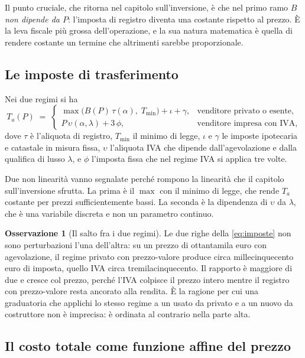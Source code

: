 \documentclass[11pt,a4paper]{article}
\theoremstyle{definition}
\newtheorem{osservazione}[definizione]{Osservazione}
\theoremstyle{plain}
\begin{document}
Il punto cruciale, che ritorna nel capitolo sull'inversione, è che nel primo ramo $B$ \emph{non dipende da $P$}: l'imposta di registro diventa una costante rispetto al prezzo. È la leva fiscale più grossa dell'operazione, e la sua natura matematica è quella di rendere costante un termine che altrimenti sarebbe proporzionale.

\subsection{Le imposte di trasferimento}

Nei due regimi si ha
\begin{equation}
T_a(P) \;=\;
\begin{cases}
\max\big(B(P)\,\tau(\alpha),\; T_{\min}\big) + \iota + \gamma, & \text{venditore privato o esente,}\\[0.4em]
P\,\upsilon(\alpha,\lambda) + 3\,\phi, & \text{venditore impresa con IVA,}
\end{cases}
\label{eq:imposte}
\end{equation}
dove $\tau$ è l'aliquota di registro, $T_{\min}$ il minimo di legge, $\iota$ e $\gamma$ le imposte ipotecaria e catastale in misura fissa, $\upsilon$ l'aliquota IVA che dipende dall'agevolazione e dalla qualifica di lusso $\lambda$, e $\phi$ l'imposta fissa che nel regime IVA si applica tre volte.

Due non linearità vanno segnalate perché rompono la linearità che il capitolo sull'inversione sfrutta. La prima è il $\max$ con il minimo di legge, che rende $T_a$ costante per prezzi sufficientemente bassi. La seconda è la dipendenza di $\upsilon$ da $\lambda$, che è una variabile discreta e non un parametro continuo.

\begin{osservazione}[Il salto fra i due regimi]
Le due righe della \eqref{eq:imposte} non sono perturbazioni l'una dell'altra: su un prezzo di ottantamila euro con agevolazione, il regime privato con prezzo-valore produce circa millecinquecento euro di imposta, quello IVA circa tremilacinquecento. Il rapporto è maggiore di due e cresce col prezzo, perché l'IVA colpisce il prezzo intero mentre il registro con prezzo-valore resta ancorato alla rendita. È la ragione per cui una graduatoria che applichi lo stesso regime a un usato da privato e a un nuovo da costruttore non è imprecisa: è ordinata al contrario nella parte alta.
\end{osservazione}

\subsection{Il costo totale come funzione affine del prezzo}
\end{document}

